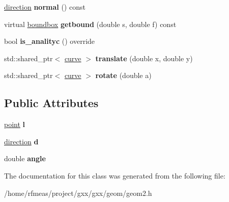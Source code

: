 \begin{DoxyCompactItemize}
\item 
\hyperlink{classmalgo_1_1unit__vector2}{direction} {\bfseries normal} () const \hypertarget{classgxx_1_1geom2_1_1line_a26b90a030a5fd8aa52dc1c160b26ea47}{}\label{classgxx_1_1geom2_1_1line_a26b90a030a5fd8aa52dc1c160b26ea47}

\item 
virtual \hyperlink{structgxx_1_1geom2_1_1boundbox}{boundbox} {\bfseries getbound} (double s, double f) const \hypertarget{classgxx_1_1geom2_1_1line_a13697abc313f9d8083854aee20ccf1ec}{}\label{classgxx_1_1geom2_1_1line_a13697abc313f9d8083854aee20ccf1ec}

\item 
bool {\bfseries is\+\_\+analityc} () override\hypertarget{classgxx_1_1geom2_1_1line_a24b36600c2dd089cbef4908ff4a495dc}{}\label{classgxx_1_1geom2_1_1line_a24b36600c2dd089cbef4908ff4a495dc}

\item 
std\+::shared\+\_\+ptr$<$ \hyperlink{classgxx_1_1geom2_1_1curve}{curve} $>$ {\bfseries translate} (double x, double y)\hypertarget{classgxx_1_1geom2_1_1line_ad800134104ac1765dc720fbd732db10a}{}\label{classgxx_1_1geom2_1_1line_ad800134104ac1765dc720fbd732db10a}

\item 
std\+::shared\+\_\+ptr$<$ \hyperlink{classgxx_1_1geom2_1_1curve}{curve} $>$ {\bfseries rotate} (double a)\hypertarget{classgxx_1_1geom2_1_1line_a1fe70d4a41cceff528bfc96cb14ea15a}{}\label{classgxx_1_1geom2_1_1line_a1fe70d4a41cceff528bfc96cb14ea15a}

\end{DoxyCompactItemize}
\subsection*{Public Attributes}
\begin{DoxyCompactItemize}
\item 
\hyperlink{classmalgo_1_1vector2}{point} {\bfseries l}\hypertarget{classgxx_1_1geom2_1_1line_ac5521fe112a13c6b7d5268b420819aaf}{}\label{classgxx_1_1geom2_1_1line_ac5521fe112a13c6b7d5268b420819aaf}

\item 
\hyperlink{classmalgo_1_1unit__vector2}{direction} {\bfseries d}\hypertarget{classgxx_1_1geom2_1_1line_a468d9186da9ce6863980f530fb77bed5}{}\label{classgxx_1_1geom2_1_1line_a468d9186da9ce6863980f530fb77bed5}

\item 
double {\bfseries angle}\hypertarget{classgxx_1_1geom2_1_1line_af16b626b85c09cd7c458159b615d46d8}{}\label{classgxx_1_1geom2_1_1line_af16b626b85c09cd7c458159b615d46d8}

\end{DoxyCompactItemize}


The documentation for this class was generated from the following file\+:\begin{DoxyCompactItemize}
\item 
/home/rfmeas/project/gxx/gxx/geom/geom2.\+h\end{DoxyCompactItemize}
